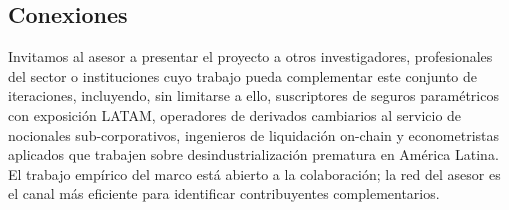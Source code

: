 \documentclass[11pt,a4paper]{article}
\theoremstyle{plain}
\begin{document}
\subsection{Conexiones}\label{sec:4-connections}

Invitamos al asesor a presentar el proyecto a otros investigadores, profesionales del sector o instituciones cuyo trabajo pueda complementar este conjunto de iteraciones, incluyendo, sin limitarse a ello, suscriptores de seguros paramétricos con exposición LATAM, operadores de derivados cambiarios al servicio de nocionales sub-corporativos, ingenieros de liquidación on-chain y econometristas aplicados que trabajen sobre desindustrialización prematura en América Latina. El trabajo empírico del marco está abierto a la colaboración; la red del asesor es el canal más eficiente para identificar contribuyentes complementarios.


\end{document}
